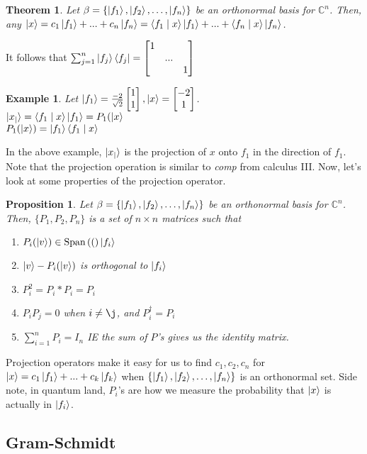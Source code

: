 \documentclass[12pt]{article}
\theoremstyle{plain}
\newtheorem{proposition}[lemma]{Proposition}
\newtheorem{theorem}[lemma]{Theorem}
\theoremstyle{nonumberplain}
\theoremstyle{plain}
\newtheorem{example}[lemma]{Example}
\theoremstyle{nonumberplain}
\newcommand\1{{\bf 1}}
\newcommand{\bmat}[1]{\begin{bmatrix*} #1 \end{bmatrix*}} %
\newcommand{\C}{\mathbb{C}} %
\newcommand{\<}{\left\langle}
\renewcommand{\>}{\right\rangle}
\newcommand{\lp}{\left(}
\newcommand{\rp}{\right)}
\newcommand{\lb}{\left\{}
\newcommand{\rb}{\right\}}
\newcommand{\inp}[2]{\left\langle#1\mid #2\right\rangle} %
\newcommand{\spn}[1]{\text{Span}\lp #1\rp} %
\newcommand{\setofkets}[1]{\lb \ket{#1_1}, \ket{#1_2}, \ldots, \ket{#1_n}\rb} %
\begin{document}
\begin{theorem}
Let $\beta=\setofkets{f}$ be an orthonormal basis for $\C^n$. Then, any $\ket{x}=c_1\ket{f_1}+...+c_n\ket{f_n}=\inp{f_1}{x}\ket{f_1}+...+\inp{f_n}{x}\ket{f_n}$.
\end{theorem}
It follows that $\sum_{j=1}^{n} \ket{f_j}\bra{f_j}=\bmat{1 &  &  \\  & ... &  \\  &  &  1}$

\begin{example}
Let $\ket{f_1}=\frac{-2}{\sqrt{2}}\bmat{1 \\ 1},\ket{x}=\bmat{-2 \\ 1}$. \\
$\ket{x_|}=\inp{f_1}{x}\ket{f_1}=P_1(\ket{x}$ \\
$P_1(\ket{x})=\ket{f_1}\inp{f_1}{x}$
\end{example}
In the above example, $\ket{x_|}$ is the projection of $x$ onto $f_1$ in the direction of $f_1$.
Note that the projection operation is similar to \textit{comp} from calculus III. Now, let's look at some properties of the projection operator.
\begin{proposition}
Let $\beta=\setofkets{f}$ be an orthonormal basis for $\C^n$. Then, $\lbrace P_1, P_2, P_n\rbrace$ is a set of $n\times n$ matrices such that
\begin{enumerate}
\item $P_i(\ket{v})\in\spn(\ket{f_i}$
\item $\ket{v}-P_i(\ket{v})$ is orthogonal to $\ket{f_i}$
\item $P_i^2=P_i*P_i=P_i$
\item $P_iP_j=0$ when $i\neq\j$, and $P_i^\dagger=P_i$
\item $\sum_{i=1}^{n} P_i=I_n$ IE the sum of $P$'s gives us the identity matrix.
\end{enumerate}
\end{proposition}

Projection operators make it easy for us to find $c_1, c_2, c_n$ for $\ket{x}=c_1\ket{f_1}+...+c_k\ket{f_k}$ when $\setofkets{f}$ is an orthonormal set. Side note, in quantum land, $P_i$'s are how we measure the probability that $\ket{x}$ is actually in $\ket{f_i}$.


\subsection{Gram-Schmidt}
\end{document}
